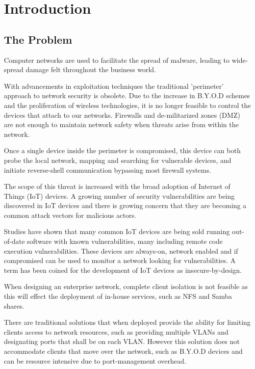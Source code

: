 \chapter{Introduction}\label{chapter:introduction}
\section{The Problem}
Computer networks are used to facilitate the spread of malware, leading to wide-spread damage felt throughout the business world. \cite{heartbleed} 

With advancements in exploitation techniques\cite{malware_detection} the traditional 'perimeter' approach to network security is obsolete. Due to the increase in B.Y.O.D schemes and the proliferation of wireless technologies, it is no longer feasible to control the devices that attach to our networks. Firewalls and de-militarized zones (DMZ) are not enough to maintain network safety when threats arise from within the network.

Once a single device inside the perimeter is compromised, this device can both probe the local network, mapping and searching for vulnerable devices, and initiate reverse-shell communication bypassing most firewall systems.

The scope of this threat is increased with the broad adoption of Internet of Things (IoT) devices. A growing number of security vulnerabilities are being discovered in IoT devices and there is growing concern that they are becoming a common attack vectors for malicious actors.\cite{iot_attack_vector}\cite{stuxnet_attack_vector}

Studies have shown that many common IoT devices are being sold running out-of-date software with known vulnerabilities, many including remote code execution vulnerabilities.\cite{insecure_by_design} These devices are always-on, network enabled and if compromised can be used to monitor a network looking for vulnerabilities. A term has been coined for the development of IoT devices as insecure-by-design. \cite{vulnerable_iot_devices}\cite{ddos_iot_devices}

When designing an enterprise network, complete client isolation is not feasible as this will effect the deployment of in-house services, such as NFS and Samba shares.

There are traditional solutions that when deployed provide the ability for limiting clients access to network resources, such as providing multiple VLANs and designating ports that shall be on each VLAN. However this solution does not accommodate clients that move over the network, such as B.Y.O.D devices and can be resource intensive due to port-management overhead.

